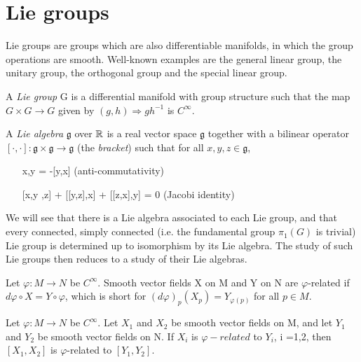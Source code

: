 \section{Lie groups}
   Lie groups are groups which are also differentiable manifolds, in which the group operations are smooth.
   Well-known examples are the general linear group, the unitary group, the orthogonal group and the 
   special linear group. 
 \begin{definition}
  A \textit{Lie group} G is a differential manifold with group structure such that the map $G \times G \rightarrow G$
  given by $(g,h) \Rightarrow gh^{-1}$ is $C^\infty$.
 \end{definition}
\begin{definition}
 A \textit{Lie algebra} $\mathfrak{g}$ over $\mathbb{R}$ is a real vector space $\mathfrak{g}$ together with a bilinear
 operator $[\cdot,\cdot]: \mathfrak{g} \times \mathfrak{g} \rightarrow \mathfrak{g}$ (the \textit{bracket}) such that
 for all $x,y,z \in \mathfrak{g}$, 
 \begin{enumerate}
  \item [x,y] = -[y,x]                         (anti-commutativity)
  \item [[x,y],z] + [[y,z],x] + [[z,x],y] = 0 (Jacobi identity)
 \end{enumerate}

\end{definition}
We will see that there is a Lie algebra associated to each Lie group, and that every connected, simply connected (i.e. 
the fundamental group $\pi_{1}(G)$ is trivial) Lie group is determined up to isomorphism by its Lie algebra. The study
of such Lie groups then reduces to a study of their Lie algebras. 
\begin{definition}
 Let $\varphi: M \rightarrow N$ be $C^{\infty}$. Smooth vector fields X on M and Y on N are $\varphi$-related if $d \varphi \circ X = Y \circ \varphi$,
 which is short for $(d\varphi)_{p}(X_{p}) = Y_{\varphi(p)}$ for all $p \in M$.
\end{definition}
\begin{exercise}
 Let $\varphi: M \rightarrow N$ be $C^{\infty}$. Let $X_{1}$ and $X_2$ be smooth vector fields on M,
 and let $Y_1$ and $Y_2$ be smooth vector fields on N. If $X_{i}$ is $\varphi-related$ to $Y_{i}$, i =1,2, then 
 $[X_1,X_2]$ is $\varphi$-related to $[Y_1,Y_2]$.
 \end{exercise}

